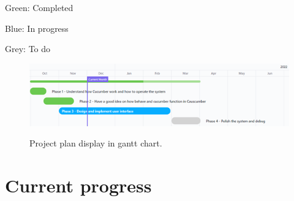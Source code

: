 Green: Completed

Blue: In progress

Grey: To do

\begin{figure}[h]
	\centering
	\includegraphics[width=16cm]{figures/Gantt_chart.png}\\
	\caption{Project plan display in gantt chart.}
	\label{fig:figure3}
\end{figure}


\section{Current progress}

